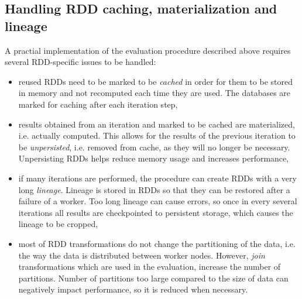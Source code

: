 \subsection{Handling RDD caching, materialization and lineage}
A practial implementation of the evaluation procedure described above requires several RDD-specific issues to be handled:
\begin{itemize}
\item reused RDDs need to be marked to be \emph{cached} in order for them to be stored in memory and not recomputed each time they are used. The databases are marked for caching after each iteration step,
\item results obtained from an iteration and marked to be cached are materialized, i.e. actually computed. This allows for the results of the previous iteration to be \emph{unpersisted}, i.e. removed from cache, as they will no longer be necessary. Unpersisting RDDs helps reduce memory usage and increases performance,
\item if many iterations are performed, the procedure can create RDDs with a very long \emph{lineage}. Lineage is stored in RDDs so that they can be restored after a failure of a worker. Too long lineage can cause errors, so once in every several iterations all results are checkpointed to persistent storage, which causes the lineage to be cropped,
\item most of RDD transformations do not change the partitioning of the data, i.e. the way the data is distributed between worker nodes. However, \emph{join} transformations which are used in the evaluation, increase the number of partitions. Number of partitions too large compared to the size of data can negatively impact performance, so it is reduced when necessary.
\end{itemize}


